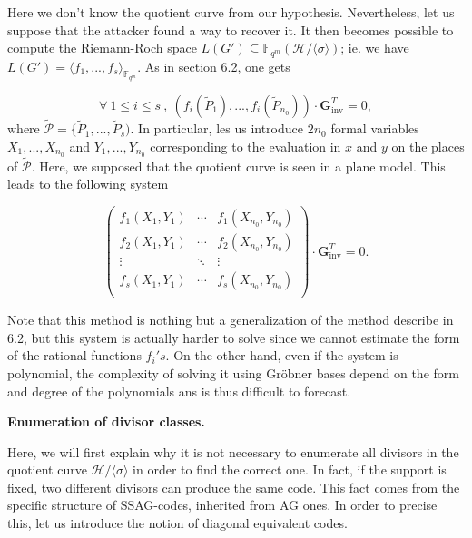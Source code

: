 \documentclass[10pt]{article}
\theoremstyle{definition}
\theoremstyle{definition}
\theoremstyle{definition}
\newcommand{\s}{\vspace{0.3cm}}
\newcommand{\cd}{\cdot}
\newcommand{\fqm}{\mathbb{F}_{q^m}}
\newcommand{\su}{\subseteq}
\newcommand{\PR}{\mathcal{P}}
\begin{document}
Here we don't know the quotient curve from our hypothesis. Nevertheless, let us suppose that the attacker found a way to recover it. It then becomes possible to compute the Riemann-Roch space $L(G') \su \fqm(\mathcal{H}/\langle \sigma \rangle)$;
ie. we have $L(G') = \langle f_1,...,f_s \rangle_{\fqm}$. As in section 6.2, one gets 

\begin{equation*}
\forall \ 1 \leq i \leq s \ , \ (f_i(\tilde{P}_1),...,f_i(\tilde{P}_{n_0})) \cd \mathbf{G}_{\mathrm{inv}}^T = 0,
\end{equation*}
where $\tilde{\PR} = \{\tilde{P}_1,...,\tilde{P}_s)$. In particular, les us introduce $2n_0$ formal variables $X_1,...,X_{n_0}$ and $Y_1,...,Y_{n_0}$ corresponding to the evaluation in $x$ and $y$ on the places of $\tilde{\PR}$. Here, we supposed that the quotient curve is seen in a plane model. This leads to the following system

\begin{equation*}
\begin{pmatrix}
f_1(X_1,Y_1) & \cdots & f_1(X_{n_0},Y_{n_0}) \\
f_2(X_1,Y_1) & \cdots & f_2(X_{n_0},Y_{n_0}) \\
\vdots & \ddots & \vdots \\
f_s(X_1,Y_1) & \cdots & f_s(X_{n_0},Y_{n_0}) \\
\end{pmatrix}
\cd \mathbf{G}_{\mathrm{inv}}^T = 0.
\end{equation*}

Note that this method is nothing but a generalization of the method describe in 6.2, but this system is actually harder to solve since we cannot estimate the form of the rational functions $f_i's$. On the other hand, even if the system is polynomial, the complexity of solving it using Gröbner bases depend on the form and degree of the polynomials ans is thus difficult to forecast.

\s

\textbf{Enumeration of divisor classes.} 

\s

Here, we will first explain why it is not necessary to enumerate all divisors in the quotient curve $\mathcal{H}/ \langle \sigma \rangle$ in order to find the correct one. In fact, if the support is fixed, two different divisors can produce the same code. This fact comes from the specific structure of SSAG-codes, inherited from AG ones. In order to precise this, let us introduce the notion of diagonal equivalent codes.
\end{document}

